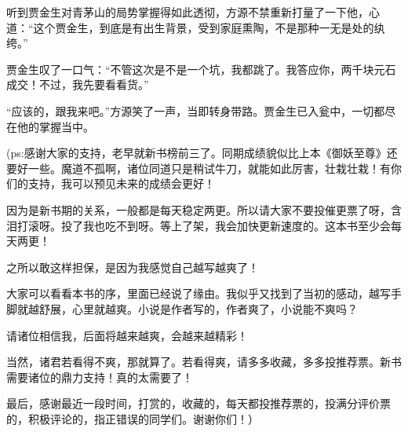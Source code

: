 \begin{this_body}
听到贾金生对青茅山的局势掌握得如此透彻，方源不禁重新打量了一下他，心道：“这个贾金生，到底是有出生背景，受到家庭熏陶，不是那种一无是处的纨绔。”

贾金生叹了一口气：“不管这次是不是一个坑，我都跳了。我答应你，两千块元石成交！不过，我先要看看货。”

“应该的，跟我来吧。”方源笑了一声，当即转身带路。贾金生已入瓮中，一切都尽在他的掌握当中。

(ps:感谢大家的支持，老早就新书榜前三了。同期成绩貌似比上本《御妖至尊》还要好一些。魔道不孤啊，诸位同道只是稍试牛刀，就能如此厉害，壮栽壮栽！有你们的支持，我可以预见未来的成绩会更好！

因为是新书期的关系，一般都是每天稳定两更。所以请大家不要投催更票了呀，含泪打滚呀。投了我也吃不到呀。等上了架，我会加快更新速度的。这本书至少会每天两更！

之所以敢这样担保，是因为我感觉自己越写越爽了！

大家可以看看本书的序，里面已经说了缘由。我似乎又找到了当初的感动，越写手脚就越舒展，心里就越爽。小说是作者写的，作者爽了，小说能不爽吗？

请诸位相信我，后面将越来越爽，会越来越精彩！

当然，诸君若看得不爽，那就算了。若看得爽，请多多收藏，多多投推荐票。新书需要诸位的鼎力支持！真的太需要了！

最后，感谢最近一段时间，打赏的，收藏的，每天都投推荐票的，投满分评价票的，积极评论的，指正错误的同学们。谢谢你们！）

\end{this_body}

